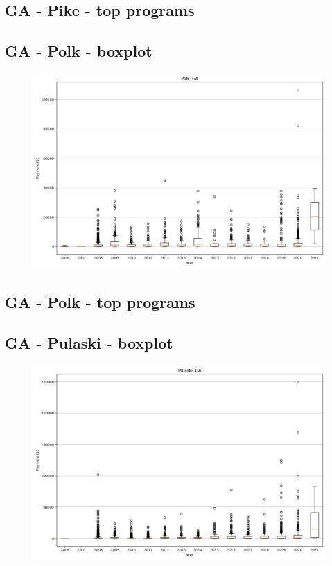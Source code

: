 \subsection*{GA - Pike - top programs}

\newpage
\subsection*{GA - Polk - boxplot}
\begin{figure}[h]
\centering
\includegraphics[width=7in]{../output/boxplots/counties/Polk-GA_boxplot.png}
\end{figure}


\subsection*{GA - Polk - top programs}

\newpage
\subsection*{GA - Pulaski - boxplot}
\begin{figure}[h]
\centering
\includegraphics[width=7in]{../output/boxplots/counties/Pulaski-GA_boxplot.png}
\end{figure}


